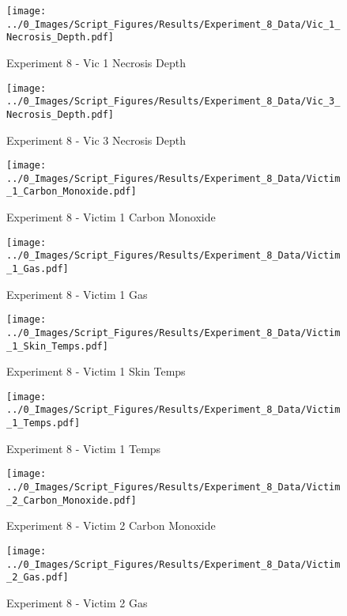 	\clearpage

	\begin{figure}[H]
		\centering
		\texttt{[image: ../0\_Images/Script\_Figures/Results/Experiment\_8\_Data/Vic\_1\_Necrosis\_Depth.pdf]}
		\caption[]{Experiment 8 - Vic 1 Necrosis Depth}
	\end{figure}
 

	\begin{figure}[H]
		\centering
		\texttt{[image: ../0\_Images/Script\_Figures/Results/Experiment\_8\_Data/Vic\_3\_Necrosis\_Depth.pdf]}
		\caption[]{Experiment 8 - Vic 3 Necrosis Depth}
	\end{figure}
 
	\clearpage

	\begin{figure}[H]
		\centering
		\texttt{[image: ../0\_Images/Script\_Figures/Results/Experiment\_8\_Data/Victim\_1\_Carbon\_Monoxide.pdf]}
		\caption[]{Experiment 8 - Victim 1 Carbon Monoxide}
	\end{figure}
 

	\begin{figure}[H]
		\centering
		\texttt{[image: ../0\_Images/Script\_Figures/Results/Experiment\_8\_Data/Victim\_1\_Gas.pdf]}
		\caption[]{Experiment 8 - Victim 1 Gas}
	\end{figure}
 
	\clearpage

	\begin{figure}[H]
		\centering
		\texttt{[image: ../0\_Images/Script\_Figures/Results/Experiment\_8\_Data/Victim\_1\_Skin\_Temps.pdf]}
		\caption[]{Experiment 8 - Victim 1 Skin Temps}
	\end{figure}
 

	\begin{figure}[H]
		\centering
		\texttt{[image: ../0\_Images/Script\_Figures/Results/Experiment\_8\_Data/Victim\_1\_Temps.pdf]}
		\caption[]{Experiment 8 - Victim 1 Temps}
	\end{figure}
 
	\clearpage

	\begin{figure}[H]
		\centering
		\texttt{[image: ../0\_Images/Script\_Figures/Results/Experiment\_8\_Data/Victim\_2\_Carbon\_Monoxide.pdf]}
		\caption[]{Experiment 8 - Victim 2 Carbon Monoxide}
	\end{figure}
 

	\begin{figure}[H]
		\centering
		\texttt{[image: ../0\_Images/Script\_Figures/Results/Experiment\_8\_Data/Victim\_2\_Gas.pdf]}
		\caption[]{Experiment 8 - Victim 2 Gas}
	\end{figure}
 
